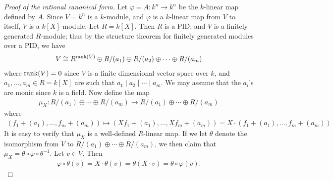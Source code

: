 \begin{proof}[Proof of the rational canonical form]
    Let $\varphi = A:k^{n} \to k^{n}$ be the $k$-linear map defined by $A$. Since $V = k^{n}$ is a $k$-module, and $\varphi$ is a $k$-linear map from $V$ to itself, $V$ is a $k[X]$-module. Let $R = k[X]$. Then $R$ is a PID, and $V$ is a finitely generated $R$-module; thus by the structure theorem for finitely generated modules over a PID, we have
    \begin{align}
        V \cong R^{\operatorname{rank}(V)} \oplus R/(a_{1}) \oplus R/(a_{2}) \oplus \cdots \oplus R/(a_{m})
    \end{align}
    where $\operatorname{rank}(V) = 0$ since $V$ is a finite dimensional vector space over $k$, and $a_{1},\ldots,a_{m} \in R = k[X]$ are such that $a_{1} \mid a_{2} \mid \cdots \mid a_{m}$. We may assume that the $a_{i}$'s are monic since $k$ is a field. Now define the map
    \begin{align}
        \mu_{X} : R/(a_{1}) \oplus \cdots \oplus R/(a_{m}) \to R/(a_{1}) \oplus \cdots \oplus R/(a_{m})
    \end{align}
    where
    \begin{align}
        (f_{1}+(a_{1}),\ldots,f_{m}+(a_{m})) \mapsto (Xf_{1}+(a_{1}),\ldots,Xf_{m}+(a_{m})) = X \cdot (f_{1}+(a_{1}),\ldots,f_{m}+(a_{m}))
    \end{align}
    It is easy to verify that $\mu_{X}$ is a well-defined $R$-linear map. If we let $\theta$ denote the isomorphism from $V$ to $R/(a_{1}) \oplus \cdots \oplus R/(a_{m})$, we then claim that $\mu_{X} = \theta \circ \varphi \circ \theta^{-1}$. Let $v \in V$. Then
    \begin{align}
        \varphi \circ \theta(v) = X \cdot \theta(v) = \theta(X \cdot v) = \theta \circ \varphi(v).
    \end{align}

\end{proof}
